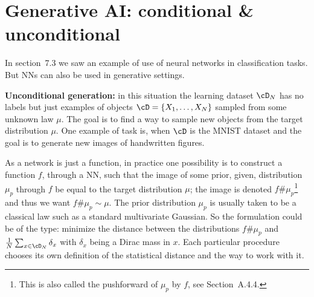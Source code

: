 \section{Generative AI: conditional \& unconditional}

In section~7.3 we saw an example of use of neural networks in classification tasks. But NNs can also be used in generative settings.

\textbf{Unconditional generation:} in this situation the learning dataset $\cD_N$ has no labels but just examples of objects $\cD = \{X_1, \ldots, X_N\}$ sampled from some unknown law $\mu$. The goal is to find a way to sample new objects from the target distribution $\mu$. One example of task is, when $\cD$ is the MNIST dataset and the goal is to generate new images of handwritten figures.

As a network is just a function, in practice one possibility is to construct a function $f$, through a NN, such that the image of some prior, given, distribution $\mu_p$ through $f$ be equal to the target distribution $\mu$; the image is denoted $f \# \mu_p$\footnote{This is also called the pushforward of $\mu_p$ by $f$, see Section~A.4.4.} and thus we want $f \# \mu_p \sim \mu$. The prior distribution $\mu_p$ is usually taken to be a classical law such as a standard multivariate Gaussian. So the formulation could be of the type: minimize the distance between the distributions $f \# \mu_p$ and $\frac{1}{N} \sum_{x \in \cD_N} \delta_x$ with $\delta_x$ being a Dirac mass in $x$. Each particular procedure chooses its own definition of the statistical distance and the way to work with it.

